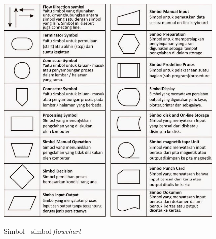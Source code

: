 \begin{flushleft}
\begin{justify}
\begin{figure}[ht]
            \includegraphics[width=12cm]{images/bab 2/symbol-fc.jpeg}\\
                \caption{Simbol - simbol \textit{flowchart}}
            \end{figure}

           
         


\end{justify}
\end{flushleft}
